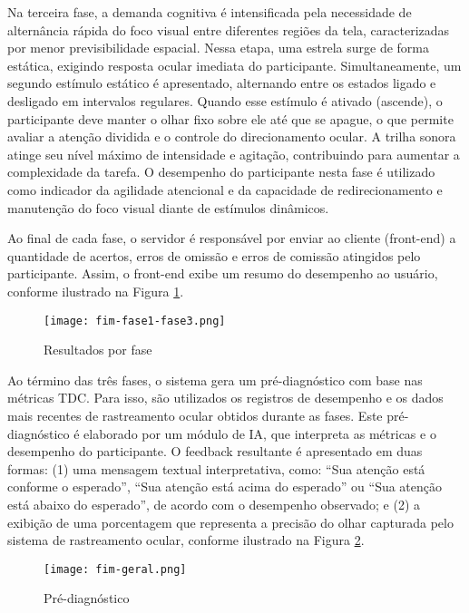 Na terceira fase, a demanda cognitiva é intensificada pela necessidade de alternância rápida do foco visual entre diferentes regiões da tela, caracterizadas por menor previsibilidade espacial. Nessa etapa, uma estrela surge de forma estática, exigindo resposta ocular imediata do participante. Simultaneamente, um segundo estímulo estático é apresentado, alternando entre os estados ligado e desligado em intervalos regulares. Quando esse estímulo é ativado (ascende), o participante deve manter o olhar fixo sobre ele até que se apague, o que permite avaliar a atenção dividida e o controle do direcionamento ocular. A trilha sonora atinge seu nível máximo de intensidade e agitação, contribuindo para aumentar a complexidade da tarefa. O desempenho do participante nesta fase é utilizado como indicador da agilidade atencional e da capacidade de redirecionamento e manutenção do foco visual diante de estímulos dinâmicos.

Ao final de cada fase, o servidor é responsável por enviar ao cliente (front-end) a quantidade de acertos, erros de omissão e erros de comissão atingidos pelo participante. Assim, o front-end exibe um resumo do desempenho ao usuário, conforme ilustrado na Figura \ref{fig:fim-fase1-fase3}.

\begin{figure}[H]
    \centering
    \caption{Resultados por fase}%
    \label{fig:fim-fase1-fase3}
    \texttt{[image: fim-fase1-fase3.png]}%
\end{figure}

Ao término das três fases, o sistema gera um pré-diagnóstico com base nas métricas TDC. Para isso, são utilizados os registros de desempenho e os dados mais recentes de rastreamento ocular obtidos durante as fases. Este pré-diagnóstico é elaborado por um módulo de IA, que interpreta as métricas e o desempenho do participante. O feedback resultante é apresentado em duas formas: (1) uma mensagem textual interpretativa, como: “Sua atenção está conforme o esperado”, “Sua atenção está acima do esperado” ou “Sua atenção está abaixo do esperado”, de acordo com o desempenho observado; e (2) a exibição de uma porcentagem que representa a precisão do olhar capturada pelo sistema de rastreamento ocular, conforme ilustrado na Figura \ref{fig:fim-geral}.

\begin{figure}[H]
    \centering
    \caption{Pré-diagnóstico}%
    \label{fig:fim-geral}
    \texttt{[image: fim-geral.png]}%
\end{figure}

